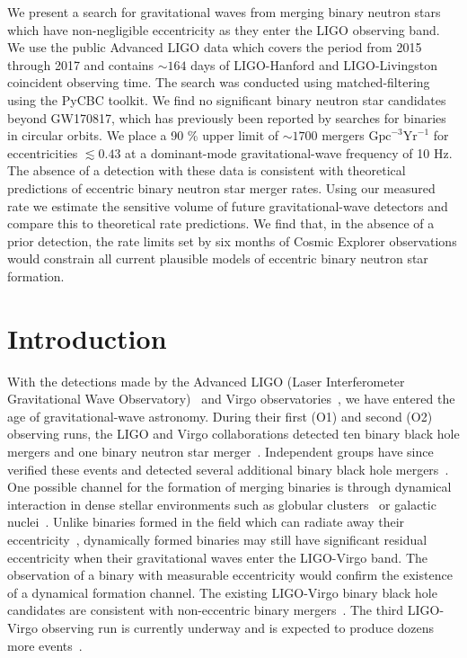 We present a search for gravitational waves from merging binary neutron stars which have non-negligible eccentricity as they enter the LIGO observing band. We use the public Advanced LIGO data which covers the period from 2015 through 2017 and contains $\sim164$ days of LIGO-Hanford and LIGO-Livingston coincident observing time. The search was conducted using matched-filtering using the PyCBC toolkit. We find no significant binary neutron star candidates beyond GW170817, which has previously been reported by searches for binaries in circular orbits. We place a 90 \% upper limit of $\sim1700$  mergers $\textrm{Gpc}^{-3} \textrm{Yr}^{-1}$ for eccentricities $\lesssim 0.43$ at a dominant-mode gravitational-wave frequency of 10 Hz. The absence of a detection with these data is consistent with theoretical predictions of eccentric binary neutron star merger rates. Using our measured rate we estimate the sensitive volume of future gravitational-wave detectors and compare this to theoretical rate predictions. We find that, in the absence of a prior detection, the rate limits set by six months of Cosmic Explorer observations would constrain all current plausible models of eccentric binary neutron star formation.

\section{Introduction}
\label{sec:intro}

With the detections made by the Advanced LIGO (Laser Interferometer Gravitational Wave Observatory)~\cite{TheLIGOScientific:2014jea} and Virgo observatories~\cite{TheVirgo:2014hva}, we have entered the age of gravitational-wave astronomy. During their first (O1) and second (O2) observing runs, the LIGO and Virgo collaborations detected ten binary black hole mergers and one binary neutron star merger~\cite{LIGOScientific:2018mvr}. Independent groups have since verified these events and detected several additional binary black hole mergers~\cite{Venumadhav:2019tad,Venumadhav:2019lyq,Nitz:2018imz,Nitz:2019hdf}. One possible channel for the formation of merging binaries is through dynamical interaction in dense stellar environments such as globular clusters~\cite{Sigurdsson:1993zrm,PortegiesZwart:1999nm,Grindlay:2005ym} or galactic nuclei~\cite{Oleary:2008myb,Antonini:2012ad}. Unlike binaries formed in the field which can radiate away their eccentricity~\cite{Peters:1964zz,Hinder:2007qu}, dynamically formed binaries may still have significant residual eccentricity when their gravitational waves enter the LIGO-Virgo band. The observation of a binary with measurable eccentricity would confirm the existence of a dynamical formation channel. The existing LIGO-Virgo binary black hole candidates are consistent with non-eccentric binary mergers~\cite{Romero-Shaw:2019itr}. The third LIGO-Virgo observing run is currently underway and is expected to produce dozens more events~\cite{Aasi:2013wya}. 

